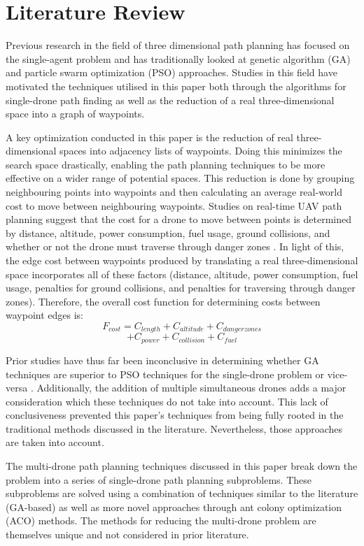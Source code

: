 \documentclass[conference]{IEEEtran}
\begin{document}
\section{Literature Review}
Previous research in the field of three dimensional path planning has focused on the single-agent problem and has traditionally looked at genetic algorithm (GA) and particle swarm optimization (PSO) approaches. Studies in this field have motivated the techniques utilised in this paper both through the algorithms for single-drone path finding as well as the reduction of a real three-dimensional space into a graph of waypoints.

A key optimization conducted in this paper is the reduction of real three-dimensional spaces into adjacency lists of waypoints. Doing this minimizes the search space drastically, enabling the path planning techniques to be more effective on a wider range of potential spaces. This reduction is done by grouping neighbouring points into waypoints and then calculating an average real-world cost to move between neighbouring waypoints. Studies on real-time UAV path planning suggest that the cost for a drone to move between points is determined by distance, altitude, power consumption, fuel usage, ground collisions, and whether or not the drone must traverse through danger zones \cite{b1}. In light of this, the edge cost between waypoints produced by translating a real three-dimensional space incorporates
all of these factors (distance, altitude, power consumption, fuel usage, penalties for ground collisions, and penalties for traversing through danger zones). Therefore, the overall cost function for determining costs between waypoint edges is:
$$F_{cost} = C_{length} + C_{altitude} + C_{danger zones}$$
$$ + C_{power} + C_{collision} + C_{fuel}$$

Prior studies have thus far been inconclusive in determining whether GA techniques are superior to PSO techniques for the single-drone problem \cite{b2} or vice-versa \cite{b3}. Additionally, the addition of multiple simultaneous drones adds a major consideration which these techniques do not take into account. This lack of conclusiveness prevented this paper's techniques from being fully rooted in the traditional methods discussed in the literature. Nevertheless, those approaches are taken into account.

The multi-drone path planning techniques discussed in this paper break down the problem into a series of single-drone path planning subproblems. These subproblems are solved using a combination of techniques similar to the literature (GA-based) as well as more novel approaches through ant colony optimization (ACO) methods. The methods for reducing the multi-drone problem are themselves unique and not considered in prior literature.
\end{document}
